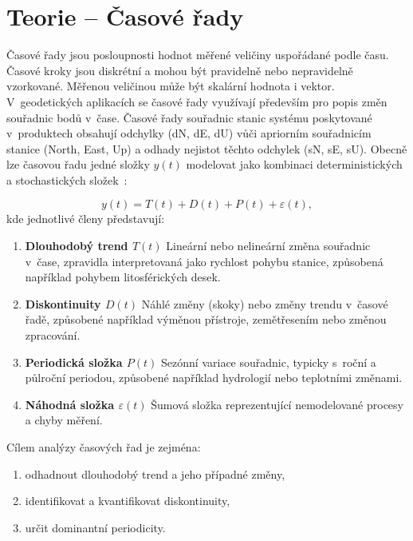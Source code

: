 \chapter{Teorie -- Časové řady}
\label{3-teorie-casove-rady}

Časové řady jsou posloupnosti hodnot měřené veličiny uspořádané podle času. Časové kroky jsou diskrétní a mohou být pravidelně nebo nepravidelně vzorkované. Měřenou veličinou může být skalární hodnota i vektor. V~geodetických aplikacích se časové řady využívají především pro popis změn souřadnic bodů v~čase. Časové řady souřadnic stanic systému  poskytované v~produktech  obsahují odchylky (dN, dE, dU) vůči apriorním souřadnicím stanice (North, East, Up) a odhady nejistot těchto odchylek (sN, sE, sU). Obecně lze časovou řadu jedné složky \(y(t)\) modelovat jako kombinaci deterministických a stochastických složek~\cite{bos_2019_time_series}:

\begin{equation}
y(t) = T(t) + D(t) + P(t) + \varepsilon(t),
\end{equation}
kde jednotlivé členy představují:

\begin{enumerate}
    \item \textbf{Dlouhodobý trend \(T(t)\)}  
    Lineární nebo nelineární změna souřadnic v~čase, zpravidla interpretovaná jako rychlost pohybu stanice, způsobená například pohybem litosférických desek.

    \item \textbf{Diskontinuity \(D(t)\)}  
    Náhlé změny (skoky) nebo změny trendu v~časové řadě, způsobené například výměnou přístroje, zemětřesením nebo změnou zpracování.

    \item \textbf{Periodická složka \(P(t)\)}  
    Sezónní variace souřadnic, typicky s~roční a půlroční periodou, způsobené například hydrologií nebo teplotními změnami.

    \item \textbf{Náhodná složka \(\varepsilon(t)\)}  
    Šumová složka reprezentující nemodelované procesy a chyby měření.
\end{enumerate}

Cílem analýzy časových řad je zejména:

\begin{enumerate}
    \item odhadnout dlouhodobý trend a jeho případné změny,
    \item identifikovat a kvantifikovat diskontinuity,
    \item určit dominantní periodicity.
\end{enumerate}

